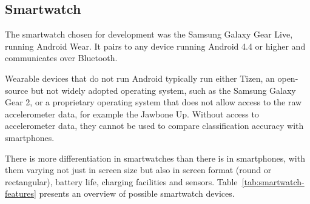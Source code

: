     
    \subsection{Smartwatch}
      \label{sec:smartwatch}
      The smartwatch chosen for development was the Samsung Galaxy Gear Live, running Android Wear.
      It pairs to any device running Android 4.4 or higher and communicates over Bluetooth.
      
      Wearable devices that do not run Android typically run either Tizen, an open-source but not 
      widely adopted operating system, such as the Samsung Galaxy Gear 2, or a proprietary 
      operating system that does not allow access to the raw accelerometer data, for example the 
      Jawbone Up. Without access to accelerometer data, they cannot be used to compare classification accuracy with smartphones.
      
      There is more differentiation in smartwatches than there is in smartphones, with them varying
      not just in screen size but also in screen format (round or rectangular), battery life,
      charging facilities and sensors. Table~\ref{tab:smartwatch-features} presents an overview of possible smartwatch devices.
      
